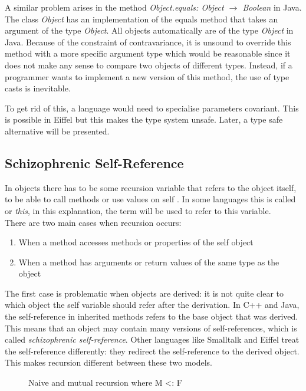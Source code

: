 A similar problem arises in the method \emph{Object.equals: Object
$\rightarrow$ Boolean} in Java. The class \emph{Object} has an
implementation of the equals method that takes an argument of the type
\emph{Object}. All objects automatically are of the type \emph{Object}
in Java.    Because of the constraint of contravariance, it is unsound
to override this method with a more specific argument type which would
be reasonable since it does not make any sense to compare two objects
of different types. Instead, if a programmer wants to implement a new
version of this method, the use of type casts is inevitable.

To get rid of this, a language would need to specialise parameters
covariant. This is possible in Eiffel but this makes the type system
unsafe. Later, a type safe alternative will be presented.

\subsection{Schizophrenic Self-Reference} 
\label{sec:schizoReferences}

In objects there has to be some recursion variable that refers to the
object itself, to be able to call methods or use values on self . In some
languages this is called \self or \emph{this}, in this explanation,
the term \self will be used to refer to this variable. \\

There are two main cases when recursion occurs:
\begin{enumerate}
	\item When a method accesses methods or properties of the self object
	\item When a method has arguments or return values of the same type as the object
\end{enumerate}

The first case is problematic when objects are derived: it is not quite
clear to which object the self variable should refer after the derivation.
In C++ and Java, the self-reference in inherited methods refers to
the base object that was derived. This means that an object may contain
many versions of self-references, which is called \emph{schizophrenic
self-reference}. Other languages like Smalltalk and Eiffel treat the
self-reference differently: they redirect the self-reference to the
derived object. This makes recursion different between these two models.

\begin{figure}
	\centering
	\caption{Naive and mutual recursion where M <: F}
	\label{fig:schizoRecursion}
\end{figure}

